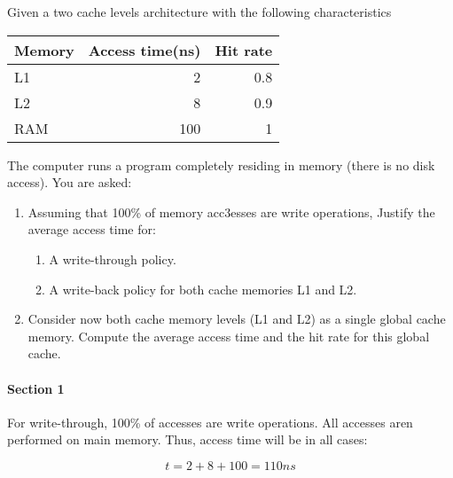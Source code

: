 \begin{acexercise}\end{acexercise}

Given a two cache levels architecture with the following characteristics

\begin{tabular}{|l|r|r|}
\hline
Memory &
Access time(ns) &
Hit rate
\\
\hline
\hline

L1 &
2 &
0.8
\\
\hline

L2 &
8 &
0.9
\\
\hline

RAM &
100 &
1
\\
\hline

\end{tabular}

The computer runs a program completely residing in memory (there is no disk access).
You are asked:

\begin{enumerate}

  \item Assuming that 100\% of memory acc3esses are write operations,
        Justify the average access time for:
    \begin{enumerate}
      \item A write-through policy.
      \item A write-back policy for both cache memories L1 and L2. 
    \end{enumerate}

  \item Consider now both cache memory levels (L1 and L2) as a single global
        cache memory. 
        Compute the average access time and the hit rate for this global cache.

\end{enumerate}

\begin{acsolution}\end{acsolution}

\paragraph{Section 1}

For write-through, 100\% of accesses are write operations.
All accesses aren performed on main memory.
Thus, access time will be in all cases:

\[
t = 2 + 8 + 100 = 110 ns
\]

